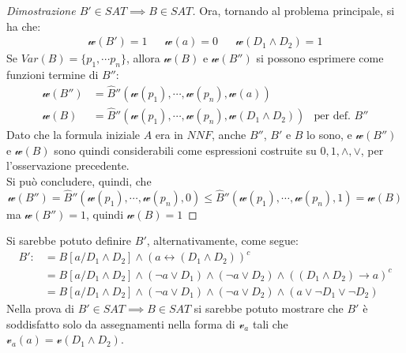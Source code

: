 \begin{proof}[Dimostrazione $B' \in SAT \implies B \in SAT$]
        Ora, tornando al problema principale, si ha che:
        \begin{align*}
        \mathcal{w}(B') = 1 &&
        \mathcal{w}(a) = 0 &&
        \mathcal{w}(D_1 \land D_2) = 1
        \end{align*}
        Se $Var(B) = \{p_1,\cdots p_n\}$, allora $\mathcal{w}(B)$ e $\mathcal{w}(B'')$ si possono esprimere come funzioni termine di $B''$:
        \begin{align*}
        \mathcal{w}(B'') & = \hat{B}''(\mathcal{w}(p_1), \cdots, \mathcal{w}(p_n), \mathcal{w}(a)) \\
        \mathcal{w}(B) & = \hat{B}''(\mathcal{w}(p_1), \cdots, \mathcal{w}(p_n), \mathcal{w}(D_1 \land D_2)) & \text{per def. } B''
        \end{align*}
        Dato che la formula iniziale $A$ era in $NNF$, anche $B''$, $B'$ e $B$ lo sono, e $\mathcal{w}(B'')$ e $\mathcal{w}(B)$ sono quindi considerabili come espressioni costruite su $0,1,\land,\lor$, per l'osservazione precedente. \\
        Si può concludere, quindi, che
        $$
        \mathcal{w}(B'') = \hat{B}''(\mathcal{w}(p_1), \cdots, \mathcal{w}(p_n), 0) \leq \hat{B}''(\mathcal{w}(p_1), \cdots, \mathcal{w}(p_n), 1) = \mathcal{w}(B)
        $$
        ma $\mathcal{w}(B'') = 1$, quindi $\mathcal{w}(B) = 1$ 
\end{proof}

\begin{oss}
        Si sarebbe potuto definire $B'$, alternativamente, come segue: 
        \begin{align*}
                B' :&= B[a/D_1 \land D_2] \land (a \leftrightarrow (D_1 \land D_2))^c \\
                   &=  B[a/D_1 \land D_2] \land (\neg a \lor D_1) \land (\neg a \lor D_2) \land ((D_1 \land D_2) \rightarrow a)^c \\
                   &=  B[a/D_1 \land D_2] \land (\neg a \lor D_1) \land (\neg a \lor D_2) \land (a \lor \neg D_1 \lor \neg D_2)
        \end{align*}
        Nella prova di $B' \in SAT \implies B \in SAT$ si sarebbe potuto mostrare che $B'$ è soddisfatto solo da assegnamenti nella forma di $\mathcal{v}_a$ tali che $\mathcal{v}_a(a) = \mathcal{v}(D_1\land D_2)$.
\end{oss}

